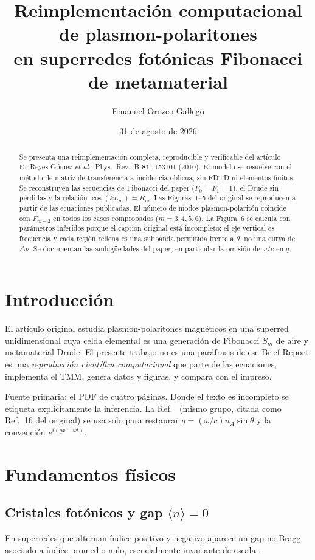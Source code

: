 \documentclass[11pt,a4paper]{article}
\title{Reimplementación computacional de plasmon-polaritones\\
en superredes fotónicas Fibonacci de metamaterial}
\author{Emanuel Orozco Gallego}
\date{31 de agosto de 2026}
\begin{document}
\maketitle

\begin{abstract}
Se presenta una reimplementación completa, reproducible y verificable del artículo
E.~Reyes-Gómez \textit{et al.}, Phys.\ Rev.\ B \textbf{81}, 153101 (2010).
El modelo se resuelve con el método de matriz de transferencia a incidencia oblicua,
sin FDTD ni elementos finitos. Se reconstruyen las secuencias de Fibonacci del paper
($F_0=F_1=1$), el Drude sin pérdidas y la relación $\cos(kL_m)=R_m$.
Las Figuras~1--5 del original se reproducen a partir de las ecuaciones publicadas.
El número de modos plasmon-polaritón coincide con $F_{m-2}$ en todos los casos
comprobados ($m=3,4,5,6$). La Figura~6 se calcula con parámetros inferidos porque
el caption original está incompleto: el eje vertical es frecuencia y cada región
rellena es una subbanda permitida frente a $\theta$, no una curva de $\Delta\nu$.
Se documentan las ambigüedades del paper, en particular la omisión de $\omega/c$ en $q$.
\end{abstract}

\tableofcontents
\newpage

\section{Introducción}

El artículo original estudia plasmon-polaritones magnéticos en una superred unidimensional
cuya celda elemental es una generación de Fibonacci $S_m$ de aire y metamaterial Drude.
El presente trabajo no es una paráfrasis de ese Brief Report: es una
\textit{reproducción científica computacional} que parte de las ecuaciones, implementa el
TMM, genera datos y figuras, y compara con el impreso.

Fuente primaria: el PDF de cuatro páginas. Donde el texto es incompleto se etiqueta
explícitamente la inferencia. La Ref.~\cite{Reyes2009EPL} (mismo grupo, citada como Ref.~16
del original) se usa solo para restaurar $q=(\omega/c)n_A\sin\theta$ y la convención
$e^{i(qx-\omega t)}$.

\section{Fundamentos físicos}

\subsection{Cristales fotónicos y gap $\langle n\rangle=0$}
En superredes que alternan índice positivo y negativo aparece un gap no Bragg asociado a
índice promedio nulo, esencialmente invariante de escala~\cite{Li2003,Bruno2008}.
\end{document}
